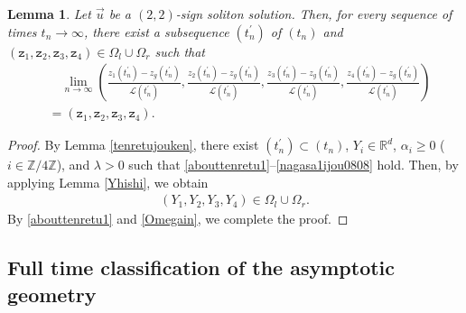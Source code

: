 \documentclass[10pt,a4paper]{amsart}
\newtheorem{lemma}[theorem]{Lemma}
\numberwithin{equation}{section}
\begin{document}
\begin{lemma}\label{sequencerough}
Let $\vec{u}$ be a $(2,2)$-sign soliton solution. Then, for every sequence of times $t_n\to\infty$, there exist a subsequence $(t_n^{\prime})$ of $(t_n)$ and $\left(\mathtt{z}_1,\mathtt{z}_2,\mathtt{z}_3,\mathtt{z}_4\right)\in \Omega_l\cup \Omega_r$ such that
\begin{align*}
&\quad\lim_{n\to\infty}\left(\frac{z_1(t_n^{\prime})-z_g(t_n^{\prime})}{\mathcal{L}(t_n^{\prime})},\frac{z_2(t_n^{\prime})-z_g(t_n^{\prime})}{\mathcal{L}(t_n^{\prime})},\frac{z_3(t_n^{\prime})-z_g(t_n^{\prime})}{\mathcal{L}(t_n^{\prime})},\frac{z_4(t_n^{\prime})-z_g(t_n^{\prime})}{\mathcal{L}(t_n^{\prime})}\right)
\\
&=\left(\mathtt{z}_1,\mathtt{z}_2,\mathtt{z}_3,\mathtt{z}_4\right).
\end{align*}
\end{lemma}

\begin{proof}
By Lemma \ref{tenretujouken}, there exist $(t_n^{\prime})\subset (t_n)$, $Y_i\in\mathbb{R}^d$, $\alpha_i\geq 0$ ($i\in\mathbb{Z}/4\mathbb{Z}$), and $\lambda>0$ such that \eqref{abouttenretu1}--\eqref{nagasa1ijou0808} hold. Then, by applying Lemma \ref{Yhishi}, we obtain
\begin{align}\label{Omegain}
(Y_1,Y_2,Y_3,Y_4)\in \Omega_l\cup \Omega_r.
\end{align}
By \eqref{abouttenretu1} and \eqref{Omegain}, we complete the proof.
\end{proof}


\subsection{Full time classification of the asymptotic geometry}
\end{document}
